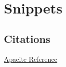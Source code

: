 \chapter{Snippets}

\section{Citations}

\href{http://mirror.aut.ac.nz/CTAN/biblio/bibtex/contrib/apacite/apacite.pdf}{Apacite Reference}

\cite{ARRI2012a}


